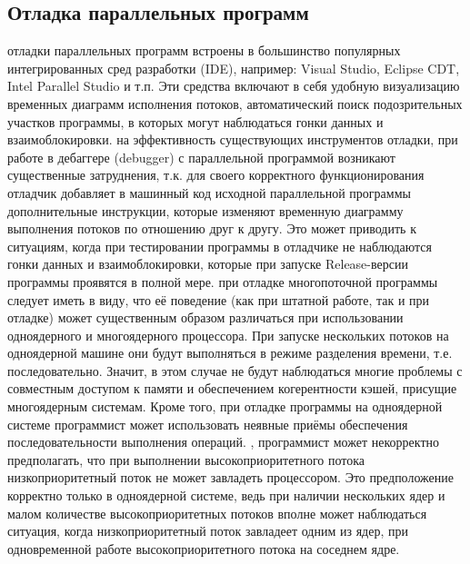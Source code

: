 { %
	\subsection{Отладка параллельных программ}
	\Large{} отладки параллельных программ встроены в большинство популярных интегрированных сред разработки (IDE), например: Visual Studio, Eclipse CDT, Intel Parallel Studio и т.п. Эти средства включают в себя удобную визуализацию временных диаграмм исполнения потоков, автоматический поиск подозрительных участков программы, в которых могут наблюдаться гонки данных и взаимоблокировки.
	 на эффективность существующих инструментов отладки, при работе в дебаггере (debugger) с параллельной программой возникают существенные затруднения, т.к. для своего корректного функционирования отладчик добавляет в машинный код исходной параллельной программы дополнительные инструкции, которые изменяют временную диаграмму выполнения потоков по отношению друг к другу. Это может приводить к ситуациям, когда при тестировании программы в отладчике не наблюдаются гонки данных и взаимоблокировки, которые при запуске Release-версии программы проявятся в полной мере.
	 при отладке многопоточной программы следует иметь в виду, что её поведение (как при штатной работе, так и при отладке) может существенным образом различаться при использовании одноядерного и многоядерного процессора. При запуске нескольких потоков на одноядерной машине они будут выполняться в режиме разделения времени, т.е. последовательно. Значит, в этом случае не будут наблюдаться многие проблемы с совместным доступом к памяти и обеспечением когерентности кэшей, присущие многоядерным системам. Кроме того, при отладке программы на одноядерной системе программист может использовать неявные приёмы обеспечения последовательности выполнения операций. 
	, программист может некорректно предполагать, что при выполнении высокоприоритетного потока низкоприоритетный поток не может завладеть процессором. Это предположение корректно только в одноядерной системе, ведь при наличии нескольких ядер и малом количестве высокоприоритетных потоков вполне может наблюдаться ситуация, когда низкоприоритетный поток завладеет одним из ядер, при одновременной работе высокоприоритетного потока на соседнем ядре.
	\par
}